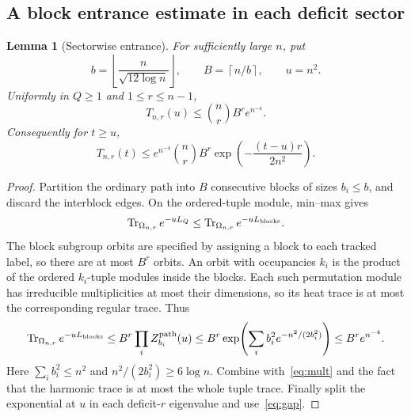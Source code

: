 \documentclass[11pt]{article}
\newtheorem{lemma}[theorem]{Lemma}
\theoremstyle{remark}
\newcommand{\Tr}{\operatorname{Tr}}
\newcommand{\floor}[1]{\left\lfloor #1\right\rfloor}
\newcommand{\ceil}[1]{\left\lceil #1\right\rceil}
\begin{document}
\subsection{A block entrance estimate in each deficit sector}
\begin{lemma}[Sectorwise entrance]\label{lem:sectorentrance}
For sufficiently large $n$, put
\[
 b=\floor{\frac n{\sqrt{12\log n}}},\qquad B=\ceil{n/b},\qquad u=n^2.
\]
Uniformly in $Q\geq1$ and $1\leq r\leq n-1$,
\begin{equation}\label{eq:sectorentrance}
 T_{n,r}(u)\leq\binom nr B^r e^{n^{-4}}.
\end{equation}
Consequently for $t\geq u$,
\begin{equation}\label{eq:tailsector}
 T_{n,r}(t)\leq
 e^{n^{-4}}\binom nr B^r\exp\!\left(-\frac{(t-u)r}{2n^2}\right).
\end{equation}
\end{lemma}
\begin{proof}
Partition the ordinary path into $B$ consecutive blocks of sizes $b_i\leq b$, and discard the interblock edges. On the ordered-tuple module, min--max gives
\[
 \Tr_{\Omega_{n,r}}e^{-uL_Q}\leq
 \Tr_{\Omega_{n,r}}e^{-uL_{\rm blocks}}.
\]
The block subgroup orbits are specified by assigning a block to each tracked label, so there are at most $B^r$ orbits. An orbit with occupancies $k_i$ is the product of the ordered $k_i$-tuple modules inside the blocks. Each such permutation module has irreducible multiplicities at most their dimensions, so its heat trace is at most the corresponding regular trace. Thus
\[
 \Tr_{\Omega_{n,r}}e^{-uL_{\rm blocks}}
 \leq B^r\prod_i Z_{b_i}^{\rm path}(u)
 \leq B^r\exp\!\left(\sum_i b_i^2e^{-n^2/(2b_i^2)}\right)
 \leq B^r e^{n^{-4}}.
\]
Here $\sum_i b_i^2\leq n^2$ and $n^2/(2b_i^2)\geq6\log n$. Combine with~\eqref{eq:mult} and the fact that the harmonic trace is at most the whole tuple trace. Finally split the exponential at $u$ in each deficit-$r$ eigenvalue and use~\eqref{eq:gap}.
\end{proof}
\end{document}
